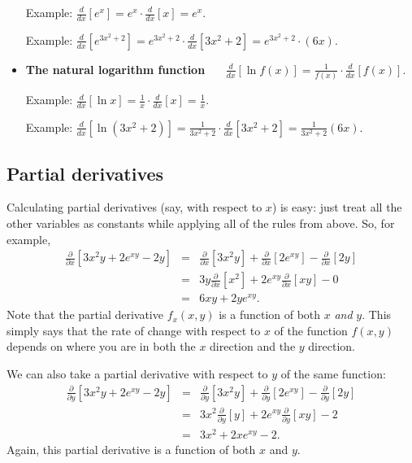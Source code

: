 \begin{CALCULUS}
\begin{itemize}
\medskip

Example: $\displaystyle \frac{d}{dx}\left[ e^x \right] = e^x\cdot
\frac{d}{dx}\left[ x\right] = e^x.$

Example: $\displaystyle \frac{d}{dx}\left[ e^{3x^2+2} \right] =
e^{3x^2+2}\cdot \frac{d}{dx}\left[ 3x^2+2\right] =
e^{3x^2+2}\cdot(6x).$

\medskip

\item \textbf{The natural logarithm function} \ \ \ $\displaystyle
\frac{d}{dx}\left[ \ln f(x) \right] =
\frac{1}{f(x)}\cdot\frac{d}{dx}\left[f(x)\right].$

\medskip
Example: $\displaystyle \frac{d}{dx}\left[ \ln x \right] =
\frac{1}{x}\cdot\frac{d}{dx}\left[x\right] = \frac{1}{x}.$

Example: $\displaystyle \frac{d}{dx}\left[ \ln (3x^2+2) \right] =
\frac{1}{3x^2+2}\cdot\frac{d}{dx}\left[3x^2+2\right] =
\frac{1}{3x^2+2}(6x).$

\end{itemize}


\subsection*{Partial derivatives}

Calculating partial derivatives (say, with respect to $x$) is easy: just treat all the other variables as constants while applying all of the rules from above. So, for example,
\begin{eqnarray*}
\frac{\partial}{\partial x}\left[ 3x^2y + 2e^{xy}-2y\right] & = & \frac{\partial}{\partial x}\left[ 3x^2y \right] + \frac{\partial}{\partial x}\left[ 2e^{xy} \right] -  \frac{\partial}{\partial x}\left[ 2y\right]\\
& = & 3y\frac{\partial}{\partial x}\left[ x^2 \right] + 2e^{xy}\frac{\partial}{\partial x}\left[ xy \right] -  0 \\
& = & 6xy + 2ye^{xy}.
\end{eqnarray*}
Note that the partial derivative $f_x(x,y)$ is a function of both $x$ \emph{and} $y$. This simply says that the rate of change with respect to $x$ of the function $f(x,y)$ depends on where you are in both the $x$ direction and the $y$ direction.

We can also take a partial derivative with respect to $y$ of the
same function:
\begin{eqnarray*}
\frac{\partial}{\partial y}\left[ 3x^2y + 2e^{xy}-2y\right] & = & \frac{\partial}{\partial y}\left[ 3x^2y \right] + \frac{\partial}{\partial y}\left[ 2e^{xy} \right] -  \frac{\partial}{\partial y}\left[ 2y\right]\\
& = & 3x^2\frac{\partial}{\partial y}\left[ y \right] + 2e^{xy}\frac{\partial}{\partial y}\left[ xy \right] -  2 \\
& = & 3x^2 + 2xe^{xy} - 2.
\end{eqnarray*}
Again, this partial derivative is a function of both $x$ and $y$.



\end{CALCULUS}
